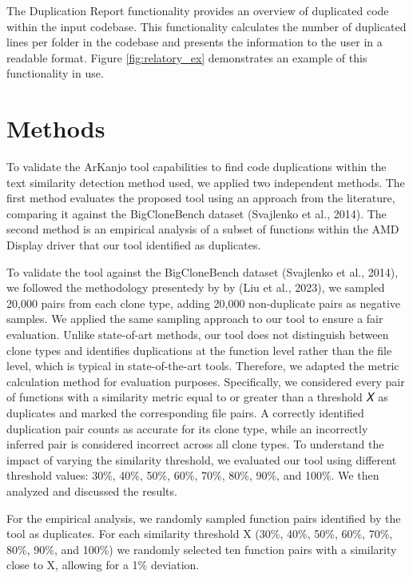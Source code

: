 \documentclass[conference]{IEEEtran}
\begin{document}
The Duplication Report functionality provides an overview of
duplicated code within the input codebase. This functionality calculates the number of
duplicated lines per folder in the codebase and presents the information to the user in
a readable format. Figure \ref{fig:relatory_ex} demonstrates an example of this functionality in use.

\section{Methods}

To validate the ArKanjo tool capabilities to find code duplications within the 
text similarity detection method used, we applied two independent
methods. The first method evaluates the proposed tool using an approach from the literature,
comparing it against the BigCloneBench dataset (Svajlenko et al., 2014). The second
method is an empirical analysis of a subset of functions within the AMD Display driver
that our tool identified as duplicates. 

To validate the tool against the BigCloneBench dataset (Svajlenko et al., 2014), we followed
the methodology presentedy by by (Liu et al., 2023), we sampled 20,000 pairs from each clone
type, adding 20,000 non-duplicate pairs as negative samples. We applied the same sampling
approach to our tool to ensure a fair evaluation.
Unlike state-of-art methods, our tool does not distinguish between clone types and
identifies duplications at the function level rather than the file level, which is typical in
state-of-the-art tools. Therefore, we adapted the metric calculation method for evaluation
purposes. Specifically, we considered every pair of functions with a similarity metric
equal to or greater than a threshold 𝑋 as duplicates and marked the corresponding file
pairs. A correctly identified duplication pair counts as accurate for its clone type, while
an incorrectly inferred pair is considered incorrect across all clone types.
To understand the impact of varying the similarity threshold, we evaluated our tool using
different threshold values: 30\%, 40\%, 50\%, 60\%, 70\%, 80\%, 90\%, and 100\%. We then analyzed
and discussed the results.

For the empirical analysis, we randomly sampled function pairs identified by the tool as
duplicates. For each similarity threshold X (30\%, 40\%, 50\%, 60\%, 70\%, 80\%, 90\%, and 100\%) 
we randomly selected ten function pairs with a similarity close to X, allowing for a 1\%
deviation.
\end{document}
